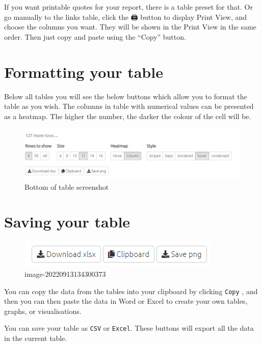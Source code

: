 \documentclass[
]{book}
\begin{document}
If you want printable quotes for your report, there is a table preset for that. Or go manually to the links table, click the 🖨️ button to display Print View, and choose the columns you want. They will be shown in the Print View in the same order. Then just copy and paste using the ``Copy'' button.

\hypertarget{xformatting-your-table}{%
\section{Formatting your table}\label{xformatting-your-table}}

Below all tables you will see the below buttons which allow you to format the table as you wish. The columns in table with numerical values can be presented as a heatmap. The higher the number, the darker the colour of the cell will be.

\begin{figure}
\centering
\includegraphics[width=6.77083in,height=\textheight]{_assets/Bottom of table screenshot.jpg}
\caption{Bottom of table screenshot}
\end{figure}

\hypertarget{xsaving-your-table}{%
\section{Saving your table}\label{xsaving-your-table}}

\begin{figure}
\centering
\includegraphics{_assets/image-20220913134300373.png}
\caption{image-20220913134300373}
\end{figure}

You can copy the data from the tables into your clipboard by clicking \texttt{Copy} , and then you can then paste the data in Word or Excel to create your own tables, graphs, or visualisations.

You can save your table as \texttt{CSV} or \texttt{Excel}. These buttons will export all the data in the current table.
\end{document}
